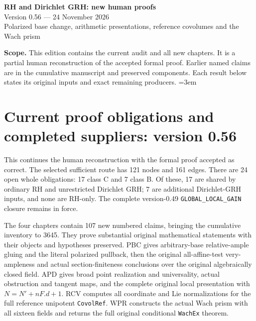 \documentclass[11pt,a4paper]{article}
\numberwithin{equation}{section}
\theoremstyle{remark}\newtheorem{remark}[theorem]{Remark}
\begin{document}
\begin{center}
{\LARGE\bfseries RH and Dirichlet GRH: new human proofs}\\[7pt]
{\large Version 0.56 --- 24 November 2026}\\[5pt]
{\large Polarized base change, arithmetic presentations, reference covolumes and the Wach prism}
\end{center}
\textbf{Scope.} This edition contains the current audit and all new chapters.
It is a partial human reconstruction of the accepted formal proof.
Earlier named claims are in the cumulative manuscript and preserved components.
Each result below states its original inputs and exact remaining producers.
\setcounter{tocdepth}{1}
\tableofcontents
\clearpage
\begingroup\emergencystretch=3em
\section{Current proof obligations and completed suppliers: version 0.56}
\label{sec:dependency-audit-v56}

This continues the human reconstruction with the formal proof accepted
as correct. The selected sufficient route has 121 nodes and 161 edges.
There are 24 open whole obligations: 17 class C and 7 class B.
Of these, 17 are shared by ordinary RH and unrestricted Dirichlet
GRH; 7 are additional Dirichlet-GRH inputs, and none are RH-only.
The complete version-0.49 \texttt{GLOBAL\_\allowbreak LOCAL\_\allowbreak GAIN} closure remains
in force.

The four chapters contain 107 new numbered claims, bringing the
cumulative inventory to 3645. They prove substantial original
mathematical statements with their objects and hypotheses preserved.
PBC gives arbitrary-base relative-ample gluing and the literal
polarized pullback, then the original all-affine-test very-ampleness
and actual section-finiteness conclusions over the original algebraically
closed field. APD gives broad point
realization and universality, actual obstruction and tangent maps,
and the complete original local presentation with
$N=N'+nF.d+1$. RCV computes all coordinate and Lie normalizations
for the full reference unipotent \texttt{Covol\allowbreak Ref}. WPR constructs
the actual Wach prism with all sixteen fields and returns the full
original conditional \texttt{Wach\allowbreak Ex} theorem.
\end{document}
